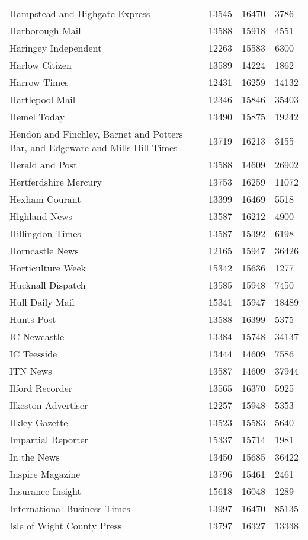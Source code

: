 \begin{longtable}{p{}p{}p{}p{}}
  Hampstead and Highgate Express & 13545 & 16470 & 3786 \\ 
  Harborough Mail & 13588 & 15918 & 4551 \\ 
  Haringey Independent & 12263 & 15583 & 6300 \\ 
  Harlow Citizen & 13589 & 14224 & 1862 \\ 
  Harrow Times & 12431 & 16259 & 14132 \\ 
  Hartlepool Mail & 12346 & 15846 & 35403 \\ 
  Hemel Today & 13490 & 15875 & 19242 \\ 
  Hendon and Finchley, Barnet and Potters Bar, and Edgeware and Mills Hill Times & 13719 & 16213 & 3155 \\ 
  Herald and Post & 13588 & 14609 & 26902 \\ 
  Hertferdshire Mercury & 13753 & 16259 & 11072 \\ 
  Hexham Courant & 13399 & 16469 & 5518 \\ 
  Highland News & 13587 & 16212 & 4900 \\ 
  Hillingdon Times & 13587 & 15392 & 6198 \\ 
  Horncastle News & 12165 & 15947 & 36426 \\ 
  Horticulture Week & 15342 & 15636 & 1277 \\ 
  Hucknall Dispatch & 13585 & 15948 & 7450 \\ 
  Hull Daily Mail & 15341 & 15947 & 18489 \\ 
  Hunts Post & 13588 & 16399 & 5375 \\ 
  IC Newcastle & 13384 & 15748 & 34137 \\ 
  IC Teesside & 13444 & 14609 & 7586 \\ 
  ITN News & 13587 & 14609 & 37944 \\ 
  Ilford Recorder & 13565 & 16370 & 5925 \\ 
  Ilkeston Advertiser & 12257 & 15948 & 5353 \\ 
  Ilkley Gazette & 13523 & 15583 & 5640 \\ 
  Impartial Reporter & 15337 & 15714 & 1981 \\ 
  In the News & 13450 & 15685 & 36422 \\ 
  Inspire Magazine & 13796 & 15461 & 2461 \\ 
  Insurance Insight & 15618 & 16048 & 1289 \\ 
  International Business Times & 13997 & 16470 & 85135 \\ 
  Isle of Wight County Press & 13797 & 16327 & 13338 \\ 

\end{longtable}

